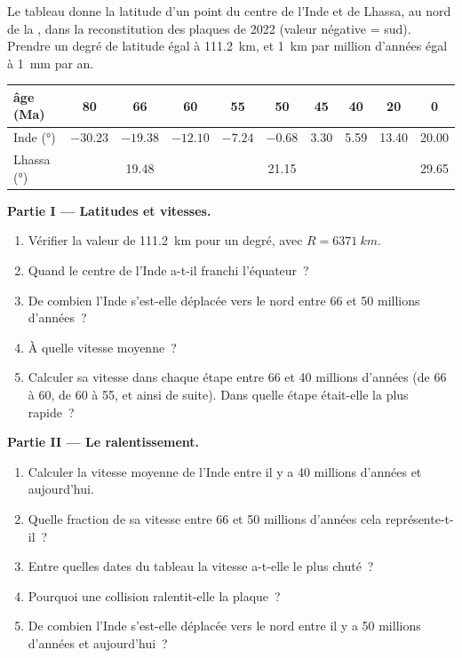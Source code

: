 \begin{problem}
\label{pb:g12:mountain-building:1}
Le tableau donne la latitude d'un point du centre de l'Inde et de Lhassa,
au nord de la , dans la reconstitution des plaques de 2022 (valeur
négative = sud). Prendre un degré de latitude égal à \qty{111.2}{km}, et
\qty{1}{km} par million d'années égal à \qty{1}{mm} par an.

\begin{center}
\small
\begin{tabular}{|l|c|c|c|c|c|c|c|c|c|}
\hline
âge (\unit{Ma}) & 80 & 66 & 60 & 55 & 50 & 45 & 40 & 20 & 0 \\ \hline
Inde (\unit{\degree}) & $-30.23$ & $-19.38$ & $-12.10$ & $-7.24$ & $-0.68$ & 3.30 & 5.59 & 13.40 & 20.00 \\ \hline
Lhassa (\unit{\degree}) & & 19.48 & & & 21.15 & & & & 29.65 \\ \hline
\end{tabular}
\end{center}

\medskip
\noindent\textbf{Partie I --- Latitudes et vitesses.}
\begin{enumerate}
  \item Vérifier la valeur de \qty{111.2}{km} pour un degré, avec $R =
        \qty{6371}{km}$.
  \item Quand le centre de l'Inde a-t-il franchi l'équateur~?
  \item De combien l'Inde s'est-elle déplacée vers le nord entre 66 et 50
        millions d'années~?
  \item À quelle vitesse moyenne~?
  \item Calculer sa vitesse dans chaque étape entre 66 et 40 millions
        d'années (de 66 à 60, de 60 à 55, et ainsi de suite). Dans quelle
        étape était-elle la plus rapide~?
\end{enumerate}

\medskip
\noindent\textbf{Partie II --- Le ralentissement.}
\begin{enumerate}[resume]
  \item Calculer la vitesse moyenne de l'Inde entre il y a 40 millions
        d'années et aujourd'hui.
  \item Quelle fraction de sa vitesse entre 66 et 50 millions d'années
        cela représente-t-il~?
  \item Entre quelles dates du tableau la vitesse a-t-elle le plus chuté~?
  \item Pourquoi une collision ralentit-elle la plaque~?
  \item De combien l'Inde s'est-elle déplacée vers le nord entre il y a 50
        millions d'années et aujourd'hui~?
\end{enumerate}


\end{problem}
